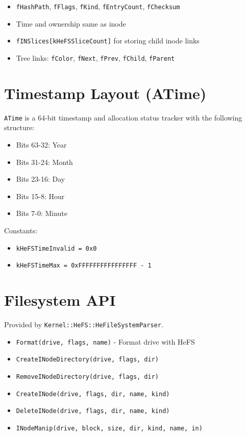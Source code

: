 \documentclass{article}
\begin{document}
\begin{itemize}
  \item \texttt{fHashPath}, \texttt{fFlags}, \texttt{fKind}, \texttt{fEntryCount}, \texttt{fChecksum}
  \item Time and ownership same as inode
  \item \texttt{fINSlices[kHeFSSliceCount]} for storing child inode links
  \item Tree links: \texttt{fColor}, \texttt{fNext}, \texttt{fPrev}, \texttt{fChild}, \texttt{fParent}
\end{itemize}

\section{Timestamp Layout (ATime)}

\texttt{ATime} is a 64-bit timestamp and allocation status tracker with the following structure:

\begin{itemize}
  \item Bits 63-32: Year
  \item Bits 31-24: Month
  \item Bits 23-16: Day
  \item Bits 15-8: Hour
  \item Bits 7-0: Minute
\end{itemize}

Constants:
\begin{itemize}
  \item \texttt{kHeFSTimeInvalid = 0x0}
  \item \texttt{kHeFSTimeMax = 0xFFFFFFFFFFFFFFFF - 1}
\end{itemize}

\section{Filesystem API}

Provided by \texttt{Kernel::HeFS::HeFileSystemParser}.

\begin{itemize}
  \item \texttt{Format(drive, flags, name)} - Format drive with HeFS
  \item \texttt{CreateINodeDirectory(drive, flags, dir)}
  \item \texttt{RemoveINodeDirectory(drive, flags, dir)}
  \item \texttt{CreateINode(drive, flags, dir, name, kind)}
  \item \texttt{DeleteINode(drive, flags, dir, name, kind)}
  \item \texttt{INodeManip(drive, block, size, dir, kind, name, in)}
\end{itemize}
\end{document}
